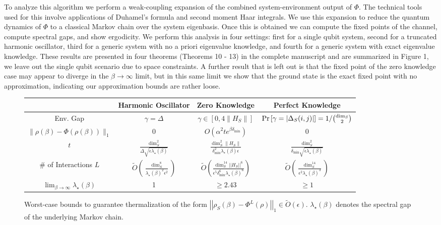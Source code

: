 \documentclass[11pt]{article}
\newcommand{\norm}[1]{\left|\left| #1 \right|\right|}
\newcommand{\bigotilde}[1]{\widetilde{O} \left( #1 \right)}
\begin{document}
To analyze this algorithm we perform a weak-coupling expansion of the combined system-environment output of $\Phi$. The technical tools used for this involve applications of Duhamel's formula and second moment Haar integrals. We use this expansion to reduce the quantum dynamics of $\Phi$ to a classical Markov chain over the system eigenbasis. Once this is obtained we can compute the fixed points of the channel, compute spectral gaps, and show ergodicity. We perform this analysis in four settings: first for a single qubit system, second for a truncated harmonic oscillator, third for a generic system with no a priori eigenvalue knowledge, and fourth for a generic system with exact eigenvalue knowledge. These results are presented in four theorems (Theorems 10 - 13) in the complete manuscript and are summarized in Figure 1, we leave out the single qubit scenario due to space constraints. A further result that is left out is that the fixed point of the zero knowledge case may appear to diverge in the $\beta \to \infty$ limit, but in this same limit we show that the ground state is the exact fixed point with no approximation, indicating our approximation bounds are rather loose.
\begin{figure}
    \begin{center}
        \begin{tabular}{|c | c| c | c |}
            \hline 
            & Harmonic Oscillator & Zero Knowledge & Perfect Knowledge \\
            \hline \hline 
            Env. Gap & $\gamma = \Delta$ & $\gamma \in [0, 4 \| H_S \| ]$ & ${\rm Pr} \left[\gamma = |\Delta_S(i,j)|\right] = 1 / \binom{\dim_S}{2}$ \\
            \hline 
            $\|\rho(\beta) - \Phi(\rho(\beta)) \|_1$ & 0 & $ O \left( \alpha^2 t e^{\beta \delta_{\min}} \right)$ & 0 \\
            \hline 
            $t$ & $\frac{\dim_S^2}{\Delta \sqrt{\epsilon \lambda_\star(\beta)} }$ & $\frac{\dim_S^2 \|H_S\| }{\delta_{\min}^2  \lambda_\star(\beta) \epsilon }$ & $\frac{\dim_S^2}{\delta_{\min} \sqrt{\epsilon \lambda_\star(\beta)} }$ \\
            \hline
            \# of Interactions $L$ & $\bigotilde{\frac{\dim_S^8}{ \lambda_\star(\beta)^2 \epsilon^2 }}$ & $\bigotilde{\frac{\dim_S^{14} \norm{H_S}^6}{\epsilon^5 \delta_{\min}^6 {\lambda}_\star(\beta)^{6} }}$ & $\bigotilde{\frac{\dim_S^{14}}{\epsilon^2 {\lambda}_\star(\beta)^3}}$  \\
            \hline
            $\lim_{\beta \to \infty} \lambda_\star(\beta)$ & 1 & $\ge 2.43$ & $\ge 1$ \\
            \hline
        \end{tabular}
    \end{center}
    \caption{Worst-case bounds to guarantee thermalization of the form $\norm{\rho_S(\beta) - \Phi^L(\rho)}_1 \in \bigotilde{\epsilon}$. $\lambda_\star(\beta)$ denotes the spectral gap of the underlying Markov chain.}
    \end{figure}
\end{document}

